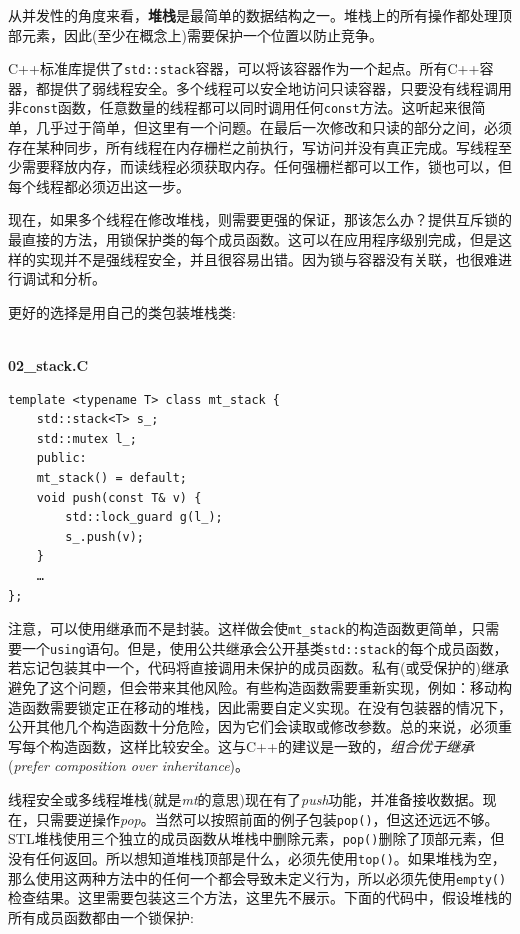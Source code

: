 
从并发性的角度来看，\textbf{堆栈}是最简单的数据结构之一。堆栈上的所有操作都处理顶部元素，因此(至少在概念上)需要保护一个位置以防止竞争。

C++标准库提供了\texttt{std::stack}容器，可以将该容器作为一个起点。所有C++容器，都提供了弱线程安全。多个线程可以安全地访问只读容器，只要没有线程调用非\texttt{const}函数，任意数量的线程都可以同时调用任何\texttt{const}方法。这听起来很简单，几乎过于简单，但这里有一个问题。在最后一次修改和只读的部分之间，必须存在某种同步，所有线程在内存栅栏之前执行，写访问并没有真正完成。写线程至少需要释放内存，而读线程必须获取内存。任何强栅栏都可以工作，锁也可以，但每个线程都必须迈出这一步。


现在，如果多个线程在修改堆栈，则需要更强的保证，那该怎么办？提供互斥锁的最直接的方法，用锁保护类的每个成员函数。这可以在应用程序级别完成，但是这样的实现并不是强线程安全，并且很容易出错。因为锁与容器没有关联，也很难进行调试和分析。

更好的选择是用自己的类包装堆栈类:

\hspace*{\fill} \\ %
\noindent
\textbf{02\_stack.C}
\begin{lstlisting}[style=styleCXX]
template <typename T> class mt_stack {
	std::stack<T> s_;
	std::mutex l_;
	public:
	mt_stack() = default;
	void push(const T& v) {
		std::lock_guard g(l_);
		s_.push(v);
	}
	…
};
\end{lstlisting}

注意，可以使用继承而不是封装。这样做会使\texttt{mt\_stack}的构造函数更简单，只需要一个\texttt{using}语句。但是，使用公共继承会公开基类\texttt{std::stack}的每个成员函数，若忘记包装其中一个，代码将直接调用未保护的成员函数。私有(或受保护的)继承避免了这个问题，但会带来其他风险。有些构造函数需要重新实现，例如：移动构造函数需要锁定正在移动的堆栈，因此需要自定义实现。在没有包装器的情况下，公开其他几个构造函数十分危险，因为它们会读取或修改参数。总的来说，必须重写每个构造函数，这样比较安全。这与C++的建议是一致的，\textit{组合优于继承}(\textit{prefer composition over inheritance})。

线程安全或多线程堆栈(就是\textit{mt}的意思)现在有了\textit{push}功能，并准备接收数据。现在，只需要逆操作\textit{pop}。当然可以按照前面的例子包装\texttt{pop()}，但这还远远不够。STL堆栈使用三个独立的成员函数从堆栈中删除元素，\texttt{pop()}删除了顶部元素，但没有任何返回。所以想知道堆栈顶部是什么，必须先使用\texttt{top()}。如果堆栈为空，那么使用这两种方法中的任何一个都会导致未定义行为，所以必须先使用\texttt{empty()}检查结果。这里需要包装这三个方法，这里先不展示。下面的代码中，假设堆栈的所有成员函数都由一个锁保护:

